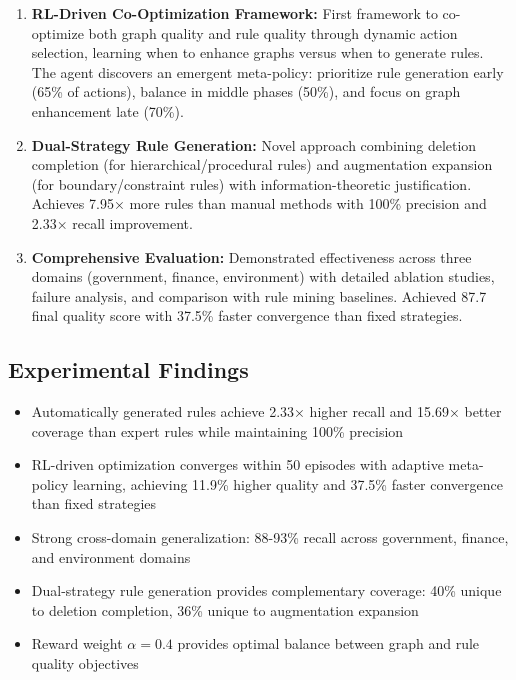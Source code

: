 \documentclass[runningheads]{llncs}
\begin{document}
\begin{enumerate}
    \item \textbf{RL-Driven Co-Optimization Framework:} First framework to co-optimize both graph quality and rule quality through dynamic action selection, learning when to enhance graphs versus when to generate rules. The agent discovers an emergent meta-policy: prioritize rule generation early (65\% of actions), balance in middle phases (50\%), and focus on graph enhancement late (70\%).

    \item \textbf{Dual-Strategy Rule Generation:} Novel approach combining deletion completion (for hierarchical/procedural rules) and augmentation expansion (for boundary/constraint rules) with information-theoretic justification. Achieves 7.95× more rules than manual methods with 100\% precision and 2.33× recall improvement.

    \item \textbf{Comprehensive Evaluation:} Demonstrated effectiveness across three domains (government, finance, environment) with detailed ablation studies, failure analysis, and comparison with rule mining baselines. Achieved 87.7 final quality score with 37.5\% faster convergence than fixed strategies.
\end{enumerate}

\subsection{Experimental Findings}

\begin{itemize}
    \item Automatically generated rules achieve 2.33× higher recall and 15.69× better coverage than expert rules while maintaining 100\% precision
    \item RL-driven optimization converges within 50 episodes with adaptive meta-policy learning, achieving 11.9\% higher quality and 37.5\% faster convergence than fixed strategies
    \item Strong cross-domain generalization: 88-93\% recall across government, finance, and environment domains
    \item Dual-strategy rule generation provides complementary coverage: 40\% unique to deletion completion, 36\% unique to augmentation expansion
    \item Reward weight $\alpha=0.4$ provides optimal balance between graph and rule quality objectives
\end{itemize}
\end{document}
